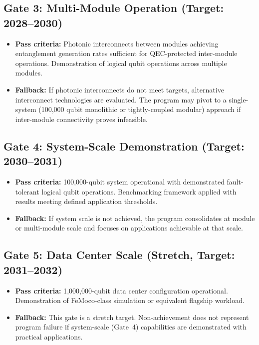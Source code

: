 \documentclass[conference]{IEEEtran}
\begin{document}
\subsection{Gate 3: Multi-Module Operation (Target: 2028--2030)}

\begin{itemize}
\item \textbf{Pass criteria:} Photonic interconnects between modules achieving entanglement generation rates sufficient for QEC-protected inter-module operations. Demonstration of logical qubit operations across multiple modules.
\item \textbf{Fallback:} If photonic interconnects do not meet targets, alternative interconnect technologies are evaluated. The program may pivot to a single-system (100,000 qubit monolithic or tightly-coupled modular) approach if inter-module connectivity proves infeasible.
\end{itemize}

\subsection{Gate 4: System-Scale Demonstration (Target: 2030--2031)}

\begin{itemize}
\item \textbf{Pass criteria:} 100,000-qubit system operational with demonstrated fault-tolerant logical qubit operations. Benchmarking framework applied with results meeting defined application thresholds.
\item \textbf{Fallback:} If system scale is not achieved, the program consolidates at module or multi-module scale and focuses on applications achievable at that scale.
\end{itemize}

\subsection{Gate 5: Data Center Scale (Stretch, Target: 2031--2032)}

\begin{itemize}
\item \textbf{Pass criteria:} 1,000,000-qubit data center configuration operational. Demonstration of FeMoco-class simulation or equivalent flagship workload.
\item \textbf{Fallback:} This gate is a stretch target. Non-achievement does not represent program failure if system-scale (Gate~4) capabilities are demonstrated with practical applications.
\end{itemize}
\end{document}
